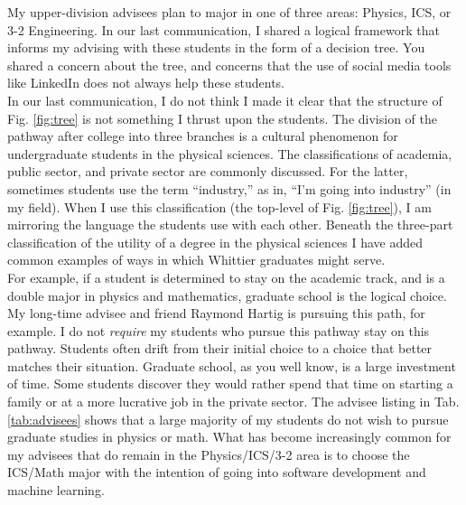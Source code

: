 \documentclass[../../main.tex]{subfiles}
\begin{document}
My upper-division advisees plan to major in one of three areas: Physics, ICS, or 3-2 Engineering.  In our last communication, I shared a logical framework that informs my advising with these students in the form of a decision tree.  You shared a concern about the tree, and concerns that the use of social media tools like LinkedIn does not always help these students.
\\
\vspace{0.25cm}
In our last communication, I do not think I made it clear that the structure of Fig. \ref{fig:tree} is not something I thrust upon the students.  The division of the pathway after college into three branches is a cultural phenomenon for undergraduate students in the physical sciences.  The classifications of academia, public sector, and private sector are commonly discussed.  For the latter, sometimes students use the term ``industry,'' as in, ``I'm going into industry'' (in my field).  When I use this classification (the top-level of Fig. \ref{fig:tree}), I am mirroring the language the students use with each other.  Beneath the three-part classification of the utility of a degree in the physical sciences I have added common examples of ways in which Whittier graduates might serve.
\\
\vspace{0.25cm}
For example, if a student is determined to stay on the academic track, and is a double major in physics and mathematics, graduate school is the logical choice.  My long-time advisee and friend Raymond Hartig is pursuing this path, for example.  I do not \textit{require} my students who pursue this pathway stay on this pathway.  Students often drift from their initial choice to a choice that better matches their situation.  Graduate school, as you well know, is a large investment of time.  Some students discover they would rather spend that time on starting a family or at a more lucrative job in the private sector.  The advisee listing in Tab. \ref{tab:advisees} shows that a large majority of my students do not wish to pursue graduate studies in physics or math.  What has become increasingly common for my advisees that do remain in the Physics/ICS/3-2 area is to choose the ICS/Math major with the intention of going into software development and machine learning.
\\
\vspace{0.25cm}
\end{document}
